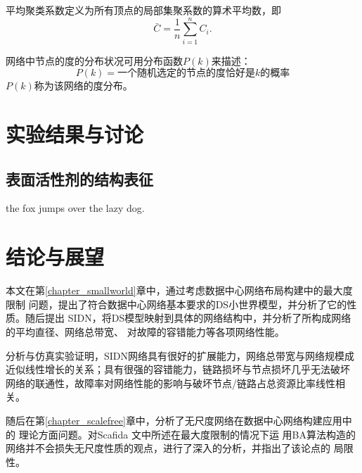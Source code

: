 \documentclass[bachelor,winfonts]{jnuthesis} %
\begin{document}
  
    
    \begin{definition}[平均聚类系数]
        平均聚类系数定义为所有顶点的局部集聚系数的算术平均数，即
        \begin{equation}
        \bar{C} = \frac{1}{n}\sum_{i=1}^{n} C_i.
        \end{equation}
    \end{definition}
    
    \begin{definition}[度分布]
        网络中节点的度的分布状况可用分布函数$P(k)$来描述：
        \begin{equation}\label{eq:degree_distribution}
        P(k) = \text{一个随机选定的节点的度恰好是$k$的概率}
        \end{equation}
        $P(k)$称为该网络的度分布。
    \end{definition}
    
    \chapter{实验结果与讨论}\label{chapter_results}
    \section{表面活性剂的结构表征}
    the fox jumps over the lazy dog.
        
    \chapter{结论与展望}\label{chapter_concludes}
    
    本文在第\ref{chapter_smallworld}章中，通过\cite{newman2001structure}考虑数据中心网络布局构建中的最大度限制
    问题，提出了符合数据中心网络基本要求的DS小世界模型，并分析了它的性质。随后提出
    SIDN，将DS模型映射到具体的网络结构中，并分析了所构成网络的平均直径、网络总带宽、
    对故障的容错能力等各项网络性能。
    
    分析与仿真实验证明，SIDN网络具有很好的扩展能力，网络总带宽与网络规模成
    近似线性增长的关系；具有很强的容错能力，链路损坏与节点损坏几乎无法破坏
    网络的联通性，故障率对网络性能的影响与破坏节点/链路占总资源比率线性相关。
    
    随后在第\ref{chapter_scalefree}章中，分析了无尺度网络在数据中心网络构建应用中的
    理论方面问题。对Scafida \cite{gyarmati2010scafida}文中所述在最大度限制的情况下运
    用BA算法构造的网络并不会损失无尺度性质的观点，进行了深入的分析，并指出了该论点的
    局限性。
    
\end{document}
